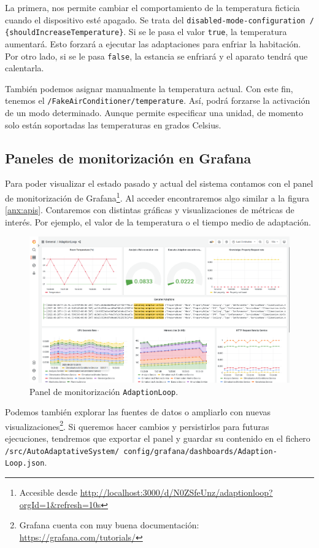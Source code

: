 La primera, nos permite cambiar el comportamiento de la temperatura ficticia cuando el dispositivo esté apagado. Se trata del  \texttt{disabled-mode-configuration / \{shouldIncreaseTemperature\}}. Si se le pasa el valor \texttt{true}, la temperatura aumentará. Esto forzará a ejecutar las adaptaciones para enfriar la habitación. Por otro lado, si se le pasa \texttt{false}, la estancia se enfriará y el aparato tendrá que calentarla.

También podemos asignar manualmente la temperatura actual. Con este fin, tenemos el  \texttt{/FakeAirConditioner/temperature}. Así, podrá forzarse la activación de un modo determinado. Aunque permite especificar una unidad, de momento solo están soportadas las temperaturas en grados Celsius.

\subsection{Paneles de monitorización en Grafana}

Para poder visualizar el estado pasado y actual del sistema contamos con el panel de monitorización de Grafana\footnote{Accesible desde \url{http://localhost:3000/d/N0ZSfeUnz/adaptionloop?orgId=1&refresh=10s}}. Al acceder encontraremos algo similar a la figura \ref{anx:apis}. Contaremos con distintas gráficas y visualizaciones de métricas de interés. Por ejemplo, el valor de la temperatura o el tiempo medio de adaptación.

\begin{figure}[h!]
  \centering
  \includegraphics[scale=0.2]{cap_despliegue/images/Grafana-panel-monitorizacion}
  \caption{Panel de monitorización \texttt{AdaptionLoop}.}
  \label{fig:ejecucion-grafana}
\end{figure}

Podemos también explorar las fuentes de datos o ampliarlo con nuevas visualizaciones\footnote{Grafana cuenta con muy buena documentación: \url{https://grafana.com/tutorials/}}. Si queremos hacer cambios y persistirlos para futuras ejecuciones, tendremos que exportar el panel y guardar su contenido en el fichero \texttt{/src/AutoAdaptativeSystem/ config/grafana/dashboards/Adaption-Loop.json}.
